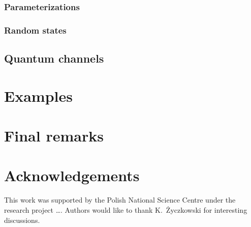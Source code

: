 \documentclass[11pt,a4paper]{article}
\newcommand{\1}{{\bf 1}}
\begin{document}
\subsubsection{Parameterizations}

\subsubsection{Random states}

\subsection{Quantum channels}

\section{Examples}

\section{Final remarks}

\section{Acknowledgements}
This work was supported by the Polish National Science Centre under the research
project \dots. Authors would like to thank K.~\.Zyczkowski for interesting
discussions.
\end{document}
